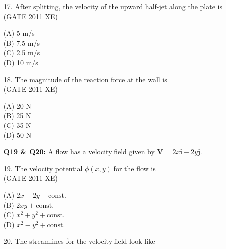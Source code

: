 \documentclass[journal,12pt,onecolumn]{IEEEtran}
\begin{document}
\begin{enumerate}
\item[17.] After splitting, the velocity of the upward half-jet along the plate is\\

\hfill{(GATE 2011 XE)} \\
\begin{multicols}{4}
(A) 5 m/s\\
(B) 7.5 m/s\\
(C) 2.5 m/s\\
(D) 10 m/s
\end{multicols}

\item[18.] The magnitude of the reaction force at the wall is\\

\hfill{(GATE 2011 XE)} \\
\begin{multicols}{4}
(A) 20 N\\
(B) 25 N\\
(C) 35 N\\
(D) 50 N
\end{multicols}

\newpage 
 
\item[\textbf{Q19 \& Q20:}]
A flow has a velocity field given by $\mathbf{V} = 2x \mathbf{i} - 2y \mathbf{j}$.\\

\item[19.] The velocity potential $\phi(x, y)$ for the flow is\\

\hfill{(GATE 2011 XE)} \\
\begin{multicols}{4}
(A) $2x - 2y + \text{const.}$\\
(B) $2xy + \text{const.}$\\
(C) $x^2 + y^2 + \text{const.}$\\
(D) $x^2 - y^2 + \text{const.}$
\end{multicols}

\item[20.] The streamlines for the velocity field look like\\


\end{enumerate}
\end{document}
